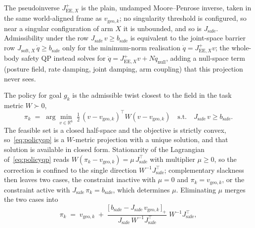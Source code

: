 \documentclass[12pt,a4paper,twoside,openright]{report}
\begin{document}
The pseudoinverse $J_{\text{EE},X}^{+}$ is the plain, undamped Moore--Penrose inverse, taken in the same world-aligned frame as $v_{\text{geo},k}$; no singularity threshold is configured, so near a singular configuration of arm $X$ it is unbounded, and so is $J_{\text{safe}}$. Admissibility under the row $J_{\text{safe}}\,v \ge b_{\text{safe}}$ is equivalent to the joint-space barrier row $J_{\text{soft},X}\,\dot{q} \ge b_{\text{safe}}$ only for the minimum-norm realisation $\dot{q} = J_{\text{EE},X}^{+}v$; the whole-body safety QP instead solves for $\dot{q} = J_{\text{EE},X}^{+}v + N\dot{q}_{\text{null}}$, adding a null-space term (posture field, rate damping, joint damping, arm coupling) that this projection never sees.

The policy for goal $g_k$ is the admissible twist closest to the field in the task metric $W \succ 0$,
\begin{equation}
\pi_k \;=\; \arg\min_{v \in \mathbb{R}^6}\; \tfrac{1}{2}\,(v - v_{\text{geo},k})^{\top} W (v - v_{\text{geo},k})
\quad \text{s.t.} \quad J_{\text{safe}}\, v \ge b_{\text{safe}}.
\label{eq:policyqp}
\end{equation}
The feasible set is a closed half-space and the objective is strictly convex, so~\eqref{eq:policyqp} is a $W$-metric projection with a unique solution, and that solution is available in closed form. Stationarity of the Lagrangian of~\eqref{eq:policyqp} reads $W(\pi_k - v_{\text{geo},k}) = \mu\,J_{\text{safe}}^{\top}$ with multiplier $\mu \ge 0$, so the correction is confined to the single direction $W^{-1}J_{\text{safe}}^{\top}$; complementary slackness then leaves two cases, the constraint inactive with $\mu = 0$ and $\pi_k = v_{\text{geo},k}$, or the constraint active with $J_{\text{safe}}\,\pi_k = b_{\text{safe}}$, which determines $\mu$. Eliminating $\mu$ merges the two cases into
\begin{equation}
\pi_k \;=\; v_{\text{geo},k} \;+\; \frac{\bigl[\,b_{\text{safe}} - J_{\text{safe}}\,v_{\text{geo},k}\,\bigr]_{+}}{J_{\text{safe}}\,W^{-1}J_{\text{safe}}^{\top}}\;W^{-1}J_{\text{safe}}^{\top},
\label{eq:policyproj}
\end{equation}
\end{document}
